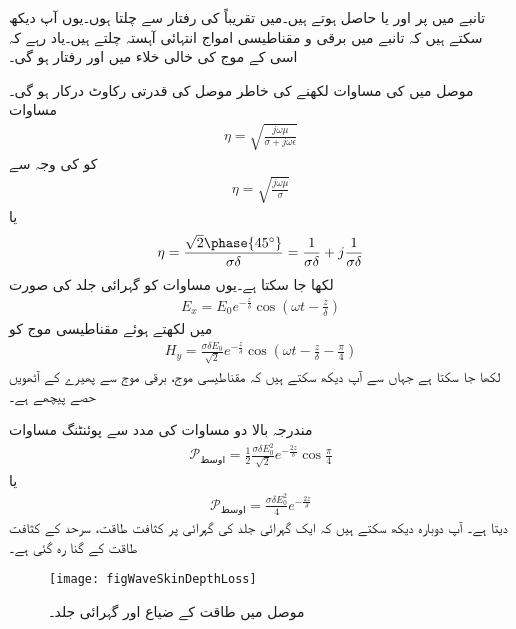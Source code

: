 تانبے میں  پر  اور  یا  حاصل ہوتے ہیں۔میں تقریباً  کی رفتار سے چلتا ہوں۔یوں آپ دیکھ سکتے ہیں کہ تانبے میں برقی و مقناطیسی امواج انتہائی آہستہ چلتے ہیں۔یاد رہے کہ اسی  کے موج کی خالی خلاء میں  اور  رفتار  ہو گی۔

موصل میں  کی مساوات لکھنے کی خاطر موصل کی قدرتی رکاوٹ درکار ہو گی۔مساوات 
\begin{align*}
\eta =\sqrt{\frac{j \omega \mu}{\sigma +j \omega \epsilon}}
\end{align*}
کو  کی وجہ سے
\begin{align*}
\eta=\sqrt{\frac{j\omega\mu}{\sigma}}
\end{align*}
یا
\begin{align}
\eta=\frac{\sqrt{2}\phase{45^\circ}}{\sigma \delta}=\frac{1}{\sigma \delta}+j\frac{1}{\sigma \delta}
\end{align}
لکھا جا سکتا ہے۔یوں مساوات  کو گہرائی جلد کی صورت
\begin{align}
E_x=E_0 e^{-\frac{z}{\delta}} \cos \left(\omega t -\frac{z}{\delta}\right)
\end{align}
 میں لکھتے ہوئے مقناطیسی موج کو
\begin{align}
H_y=\frac{\sigma \delta E_0}{\sqrt{2}} e^{-\frac{z}{\delta}} \cos \left(\omega t-\frac{z}{\delta}-\frac{\pi}{4}\right)
\end{align}
لکھا جا سکتا ہے جہاں سے آپ دیکھ سکتے ہیں کہ مقناطیسی موج، برقی موج سے  پھیرے کے آٹھویں حصے پیچھے ہے۔

مندرجہ بالا دو مساوات کی مدد سے پوئنٹنگ مساوات
 \begin{align*}
\mathscr{P}_{\text{اوسط}}=\frac{1}{2} \frac{\sigma \delta E_0^2}{\sqrt{2}} e^{-\frac{2 z}{\delta}} \cos \frac{\pi}{4}
\end{align*}
یا
\begin{align*}
\mathscr{P}_{\text{اوسط}}=\frac{\sigma \delta E_0^2}{4} e^{-\frac{2 z}{\delta}}
\end{align*}
دیتا ہے۔ آپ دوبارہ دیکھ سکتے ہیں کہ ایک گہرائی جلد کی گہرائی پر کثافت طاقت، سرحد کے کثافت طاقت کے  گنا رہ گئی ہے۔

\begin{figure}
\centering
\texttt{[image: figWaveSkinDepthLoss]}
\caption{موصل میں طاقت کے ضیاع اور گہرائی جلد۔}
\label{شکل_موج_گہرائی_جلد_اور_طاقتی_ضیاع}
\end{figure}

